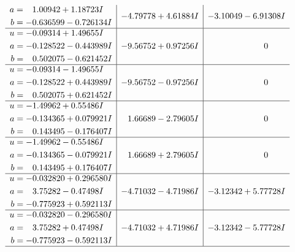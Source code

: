 \documentclass[1p]{elsarticle_modified}
\theoremstyle{definition}
\begin{document}
$$\begin{array}{c|c|c}
\begin{aligned}
a &= \phantom{-}1.00942 + 1.18723 I \\
b &= -0.636599 - 0.726134 I\end{aligned}
 & -4.79778 + 4.61884 I & -3.10049 - 6.91308 I \\ \hline\begin{aligned}
u &= -0.09314 + 1.49655 I \\
a &= -0.128522 - 0.443989 I \\
b &= \phantom{-}0.502075 - 0.621452 I\end{aligned}
 & -9.56752 + 0.97256 I & \phantom{-0.000000 } 0 \\ \hline\begin{aligned}
u &= -0.09314 - 1.49655 I \\
a &= -0.128522 + 0.443989 I \\
b &= \phantom{-}0.502075 + 0.621452 I\end{aligned}
 & -9.56752 - 0.97256 I & \phantom{-0.000000 } 0 \\ \hline\begin{aligned}
u &= -1.49962 + 0.55486 I \\
a &= -0.134365 + 0.079921 I \\
b &= \phantom{-}0.143495 - 0.176407 I\end{aligned}
 & \phantom{-}1.66689 - 2.79605 I & \phantom{-0.000000 } 0 \\ \hline\begin{aligned}
u &= -1.49962 - 0.55486 I \\
a &= -0.134365 - 0.079921 I \\
b &= \phantom{-}0.143495 + 0.176407 I\end{aligned}
 & \phantom{-}1.66689 + 2.79605 I & \phantom{-0.000000 } 0 \\ \hline\begin{aligned}
u &= -0.032820 + 0.296580 I \\
a &= \phantom{-}3.75282 - 0.47498 I \\
b &= -0.775923 + 0.592113 I\end{aligned}
 & -4.71032 - 4.71986 I & -3.12342 + 5.77728 I \\ \hline\begin{aligned}
u &= -0.032820 - 0.296580 I \\
a &= \phantom{-}3.75282 + 0.47498 I \\
b &= -0.775923 - 0.592113 I\end{aligned}
 & -4.71032 + 4.71986 I & -3.12342 - 5.77728 I\\
 \hline 
 \end{array}$$\newpage
\end{document}
